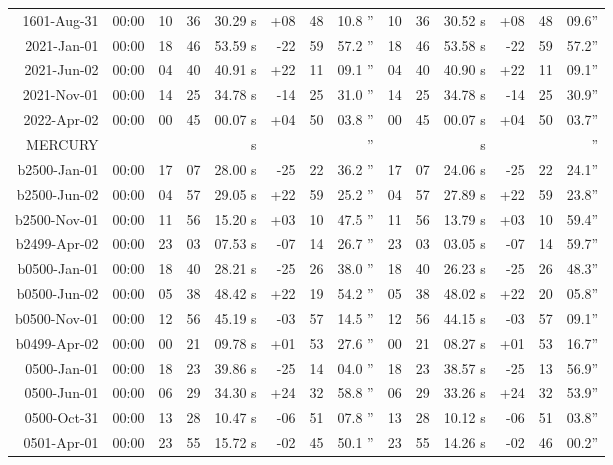 \begin{longtable}{r@{\,}r|r@{h\,}r@{m\,}r<{s}|r@{°\,}r@{'\,}r<{''}||r@{h\,}r@{m\,}r<{s}|r@{°\,}r@{'\,}r<{''}}
 1601-Aug-31 & 00:00  &   10 & 36 & 30.29 & +08 & 48 & 10.8 & 10&36&30.52 & +08&48&09.6\\ %
 2021-Jan-01 & 00:00  &   18 & 46 & 53.59 & -22 & 59 & 57.2 & 18&46&53.58 & -22&59&57.2\\ %
 2021-Jun-02 & 00:00  &   04 & 40 & 40.91 & +22 & 11 & 09.1 & 04&40&40.90 & +22&11&09.1\\ %
 2021-Nov-01 & 00:00  &   14 & 25 & 34.78 & -14 & 25 & 31.0 & 14&25&34.78 & -14&25&30.9\\ %
 2022-Apr-02 & 00:00  &   00 & 45 & 00.07 & +04 & 50 & 03.8 & 00&45&00.07 & +04&50&03.7\\ %
MERCURY  \\
b2500-Jan-01 & 00:00  &   17 & 07 & 28.00 & -25 & 22 & 36.2 & 17&07&24.06 & -25&22&24.1\\ %
b2500-Jun-02 & 00:00  &   04 & 57 & 29.05 & +22 & 59 & 25.2 & 04&57&27.89 & +22&59&23.8\\ %
b2500-Nov-01 & 00:00  &   11 & 56 & 15.20 & +03 & 10 & 47.5 & 11&56&13.79 & +03&10&59.4\\ %
b2499-Apr-02 & 00:00  &   23 & 03 & 07.53 & -07 & 14 & 26.7 & 23&03&03.05 & -07&14&59.7\\ %
b0500-Jan-01 & 00:00  &   18 & 40 & 28.21 & -25 & 26 & 38.0 & 18&40&26.23 & -25&26&48.3\\ %
b0500-Jun-02 & 00:00  &   05 & 38 & 48.42 & +22 & 19 & 54.2 & 05&38&48.02 & +22&20&05.8\\ %
b0500-Nov-01 & 00:00  &   12 & 56 & 45.19 & -03 & 57 & 14.5 & 12&56&44.15 & -03&57&09.1\\ %
b0499-Apr-02 & 00:00  &   00 & 21 & 09.78 & +01 & 53 & 27.6 & 00&21&08.27 & +01&53&16.7\\ %
 0500-Jan-01 & 00:00  &   18 & 23 & 39.86 & -25 & 14 & 04.0 & 18&23&38.57 & -25&13&56.9\\ %
 0500-Jun-01 & 00:00  &   06 & 29 & 34.30 & +24 & 32 & 58.8 & 06&29&33.26 & +24&32&53.9\\ %
 0500-Oct-31 & 00:00  &   13 & 28 & 10.47 & -06 & 51 & 07.8 & 13&28&10.12 & -06&51&03.8\\ %
 0501-Apr-01 & 00:00  &   23 & 55 & 15.72 & -02 & 45 & 50.1 & 23&55&14.26 & -02&46&00.2\\ %

\end{longtable}
